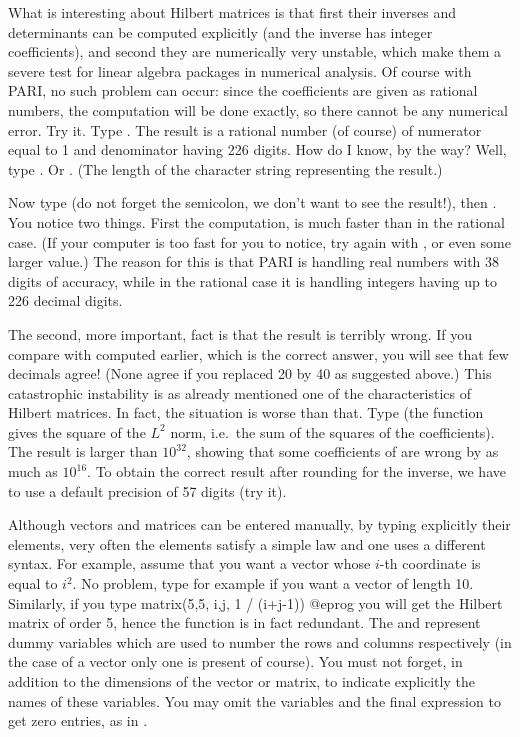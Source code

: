 What is interesting about Hilbert matrices is that first their inverses and
determinants can be computed explicitly (and the inverse has integer
coefficients), and second they are numerically very unstable, which make them
a severe test for linear algebra packages in numerical analysis.  Of course
with PARI, no such problem can occur: since the coefficients are given as
rational numbers, the computation will be done exactly, so there cannot be
any numerical error. Try it. Type . The result is a
rational number (of course) of numerator equal to 1 and denominator having
226 digits. How do I know, by the way? Well, type . Or
. (The length of the character string representing the
result.)

Now type  (do not forget the semicolon, we don't want to see
the result!), then . You notice two things. First the
computation, is much faster than in the rational case. (If your computer is
too fast for you to notice, try again with , or
even some larger value.) The reason for this is that PARI is handling real
numbers with 38 digits of accuracy, while in the rational case it is
handling integers having up to 226 decimal digits.

The second, more important, fact is that the result is terribly wrong. If you
compare with  computed earlier, which is the correct answer, you
will see that few decimals agree! (None agree if you replaced 20 by 40 as
suggested above.) This catastrophic instability is as already mentioned one
of the characteristics of Hilbert matrices. In fact, the situation is
worse than that. Type  (the function 
gives the square of the $L^2$ norm, i.e.~the sum of the squares of the
coefficients). The result is larger than $10^{32}$, showing that some
coefficients of  are wrong by as much as $10^{16}$. To obtain the
correct result after rounding for the inverse, we have to use a default
precision of 57 digits (try it).

Although vectors and matrices can be entered manually, by typing explicitly
their elements, very often the elements satisfy a simple law and one uses a
different syntax. For example, assume that you want a vector whose $i$-th
coordinate is equal to $i^2$. No problem, type for example
 if you want a vector of length 10. Similarly, if
you type
\bprog
  matrix(5,5, i,j, 1 / (i+j-1))
@eprog\noindent
you will get the Hilbert matrix of order 5, hence the 
function is in fact redundant.  The  and  represent dummy
variables which are used to number the rows and columns respectively (in
the case of a vector only one is present of course). You must not forget,
in addition to the dimensions of the vector or matrix, to indicate
explicitly the names of these variables. You may omit the variables and
the final expression to get zero entries, as in .

